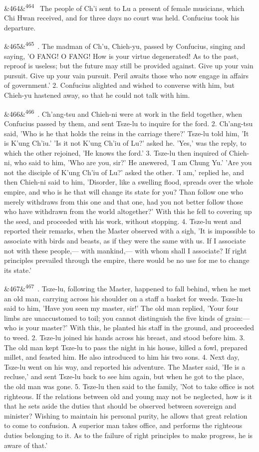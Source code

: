 \documentclass[12pt]{article}
\newcommand{\para}[1][]{\par\noindent\ifx&#1&\else\textsuperscript{\footnotesize #1}~\fi}
\begin{document}
\para[464] The people of Ch'i sent to Lu a present of female musicians, which Chi Hwan received, and for three days no court was held. Confucius took his departure.

\para[465] 1. The madman of Ch'u, Chieh-yu, passed by Confucius, singing and saying, 'O FANG! O FANG! How is your virtue degenerated! As to the past, reproof is useless; but the future may still be provided against. Give up your vain pursuit. Give up your vain pursuit. Peril awaits those who now engage in affairs of government.' 2. Confucius alighted and wished to converse with him, but Chieh-yu hastened away, so that he could not talk with him.

\para[466] 1. Ch'ang-tsu and Chieh-ni were at work in the field together, when Confucius passed by them, and sent Tsze-lu to inquire for the ford. 2. Ch'ang-tsu said, 'Who is he that holds the reins in the carriage there?' Tsze-lu told him, 'It is K'ung Ch'iu.' 'Is it not K'ung Ch'iu of Lu?' asked he. 'Yes,' was the reply, to which the other rejoined, 'He knows the ford.' 3. Tsze-lu then inquired of Chieh-ni, who said to him, 'Who are you, sir?' He answered, 'I am Chung Yu.' 'Are you not the disciple of K'ung Ch'iu of Lu?' asked the other. 'I am,' replied he, and then Chieh-ni said to him, 'Disorder, like a swelling flood, spreads over the whole empire, and who is he that will change its state for you? Than follow one who merely withdraws from this one and that one, had you not better follow those who have withdrawn from the world altogether?' With this he fell to covering up the seed, and proceeded with his work, without stopping. 4. Tsze-lu went and reported their remarks, when the Master observed with a sigh, 'It is impossible to associate with birds and beasts, as if they were the same with us. If I associate not with these people,--- with mankind,--- with whom shall I associate? If right principles prevailed through the empire, there would be no use for me to change its state.'

\para[467] 1. Tsze-lu, following the Master, happened to fall behind, when he met an old man, carrying across his shoulder on a staff a basket for weeds. Tsze-lu said to him, 'Have you seen my master, sir!' The old man replied, 'Your four limbs are unaccustomed to toil; you cannot distinguish the five kinds of grain:--- who is your master?' With this, he planted his staff in the ground, and proceeded to weed. 2. Tsze-lu joined his hands across his breast, and stood before him. 3. The old man kept Tsze-lu to pass the night in his house, killed a fowl, prepared millet, and feasted him. He also introduced to him his two sons. 4. Next day, Tsze-lu went on his way, and reported his adventure. The Master said, 'He is a recluse,' and sent Tsze-lu back to see him again, but when he got to the place, the old man was gone. 5. Tsze-lu then said to the family, 'Not to take office is not righteous. If the relations between old and young may not be neglected, how is it that he sets aside the duties that should be observed between sovereign and minister? Wishing to maintain his personal purity, he allows that great relation to come to confusion. A superior man takes office, and performs the righteous duties belonging to it. As to the failure of right principles to make progress, he is aware of that.'
\end{document}
